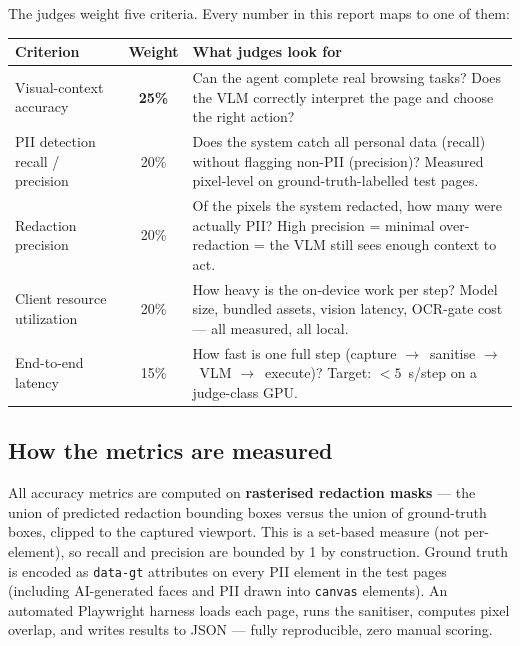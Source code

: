 \documentclass[11pt,a4paper]{article}
\newcommand{\code}[1]{\texttt{#1}}
\newcommand{\arw}{$\rightarrow$}
\begin{document}
The judges weight five criteria. Every number in this report maps to one of them:

\begin{table}[H]
\centering
\small
\begin{tabularx}{\textwidth}{>{\raggedright\arraybackslash}p{3.6cm} c X}
\toprule
\textbf{Criterion} & \textbf{Weight} & \textbf{What judges look for}\\
\midrule
Visual-context accuracy & \textbf{25\%} & Can the agent complete real browsing tasks? Does the VLM correctly interpret the page and choose the right action?\\
\addlinespace
PII detection recall / precision & 20\% & Does the system catch all personal data (recall) without flagging non-PII (precision)? Measured pixel-level on ground-truth-labelled test pages.\\
\addlinespace
Redaction precision & 20\% & Of the pixels the system redacted, how many were actually PII? High precision = minimal over-redaction = the VLM still sees enough context to act.\\
\addlinespace
Client resource utilization & 20\% & How heavy is the on-device work per step? Model size, bundled assets, vision latency, OCR-gate cost --- all measured, all local.\\
\addlinespace
End-to-end latency & 15\% & How fast is one full step (capture \arw\ sanitise \arw\ VLM \arw\ execute)? Target: $<5$~s/step on a judge-class GPU.\\
\bottomrule
\end{tabularx}
\end{table}

\subsection*{How the metrics are measured}
All accuracy metrics are computed on \textbf{rasterised redaction masks} --- the union of predicted redaction bounding boxes versus the union of ground-truth boxes, clipped to the captured viewport. This is a set-based measure (not per-element), so recall and precision are bounded by 1 by construction. Ground truth is encoded as \code{data-gt} attributes on every PII element in the test pages (including AI-generated faces and PII drawn into \code{canvas} elements). An automated Playwright harness loads each page, runs the sanitiser, computes pixel overlap, and writes results to JSON --- fully reproducible, zero manual scoring.

\end{document}
